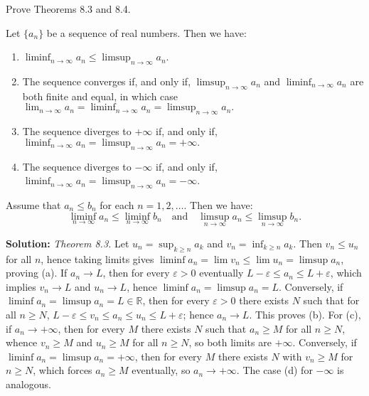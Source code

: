 \begin{problembox}
Prove Theorems 8.3 and 8.4.

\begin{theorem}[Theorem 8.3]
Let \(\{a_n\}\) be a sequence of real numbers. Then we have:
\begin{enumerate}[label=\alph*)]
\item \(\liminf_{n \to \infty} a_n \leq \limsup_{n \to \infty} a_n.\)
\item The sequence converges if, and only if, \(\limsup_{n \to \infty} a_n\) and \(\liminf_{n \to \infty} a_n\) are both finite and equal, in which case \(\lim_{n \to \infty} a_n = \liminf_{n \to \infty} a_n = \limsup_{n \to \infty} a_n.\)
\item The sequence diverges to \(+\infty\) if, and only if, \(\liminf_{n \to \infty} a_n = \limsup_{n \to \infty} a_n = +\infty.\)
\item The sequence diverges to \(-\infty\) if, and only if, \(\liminf_{n \to \infty} a_n = \limsup_{n \to \infty} a_n = -\infty\).
\end{enumerate}
\end{theorem}

\begin{theorem}[Theorem 8.4]
Assume that \(a_n \leq b_n\) for each \(n = 1, 2, \ldots\). Then we have:
\[
\liminf_{n \to \infty} a_n \leq \liminf_{n \to \infty} b_n \quad \text{and} \quad \limsup_{n \to \infty} a_n \leq \limsup_{n \to \infty} b_n.
\]
\end{theorem}

\end{problembox}

\noindent\textbf{Solution:}
\emph{Theorem 8.3.} Let \(u_n=\sup_{k\ge n} a_k\) and \(v_n=\inf_{k\ge n} a_k\). Then \(v_n\le u_n\) for all \(n\), hence taking limits gives \(\liminf a_n=\lim v_n\le \lim u_n=\limsup a_n\), proving (a). If \(a_n\to L\), then for every \(\varepsilon>0\) eventually \(L-\varepsilon\le a_n\le L+\varepsilon\), which implies \(v_n\to L\) and \(u_n\to L\), hence \(\liminf a_n=\limsup a_n=L\). Conversely, if \(\liminf a_n=\limsup a_n=L\in\mathbb{R}\), then for every \(\varepsilon>0\) there exists \(N\) such that for all \(n\ge N\), \(L-\varepsilon\le v_n\le a_n\le u_n\le L+\varepsilon\); hence \(a_n\to L\). This proves (b). For (c), if \(a_n\to +\infty\), then for every \(M\) there exists \(N\) such that \(a_n\ge M\) for all \(n\ge N\), whence \(v_n\ge M\) and \(u_n\ge M\) for all \(n\ge N\), so both limits are \(+\infty\). Conversely, if \(\liminf a_n=\limsup a_n=+\infty\), then for every \(M\) there exists \(N\) with \(v_n\ge M\) for \(n\ge N\), which forces \(a_n\ge M\) eventually, so \(a_n\to +\infty\). The case (d) for \(-\infty\) is analogous.

